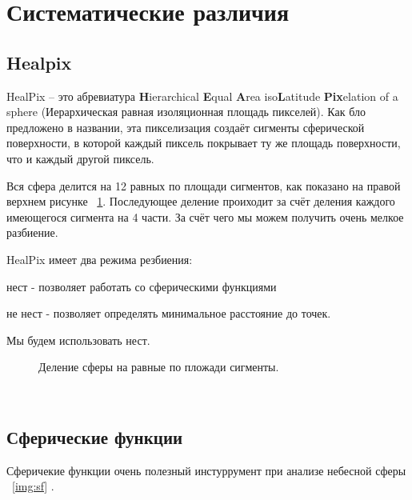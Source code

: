 \documentclass[14pt,a4paper,russian]{article}
\begin{document}
\section{Систематические различия}\label{sistem}
		
\subsection{Healpix}\label{sub:smthhealpix}
HealPix -- это абревиатура \textbf{H}ierarchical \textbf{E}qual \textbf{A}rea iso\textbf{L}atitude \textbf{Pix}elation of a sphere (Иерархическая равная изоляционная площадь пикселей). Как бло предложено в названии, эта пикселизация создаёт сигменты сферической поверхности, в которой каждый пиксель покрывает ту же площадь поверхности, что и каждый другой пиксель.

Вся сфера делится на 12 равных по площади сигментов, как показано на правой верхнем рисунке ~\ref{img:healpix}. Последующее деление проиходит за счёт деления каждого имеющегося сигмента на 4 части. За счёт чего мы можем получить очень мелкое разбиение. 

HealPix имеет два режима резбиения:

\* нест - позволяет работать со сферическими функциями

\* не нест - позволяет определять минимальное расстояние до точек.

Мы будем использовать нест.

\begin{figure}[h!]
\caption{Деление сферы на равные по пложади сигменты.}
\label{img:healpix}
\end{figure}

~\cite{wiki:healpix} 


\subsection{Сферические функции}\label{sub:smthsf}
Сферичекие функции очень полезный инстуррумент при анализе небесной сферы ~\ref{img:sf} .
~\cite{book:sf}
\end{document}
